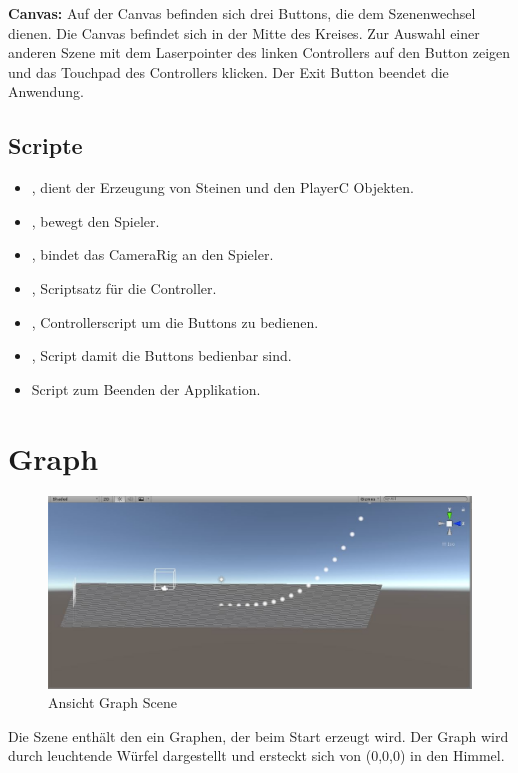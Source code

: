 \textbf{Canvas: } Auf der Canvas befinden sich drei Buttons, die dem Szenenwechsel dienen. Die Canvas befindet sich in der Mitte des Kreises. Zur Auswahl einer anderen Szene mit dem Laserpointer des linken Controllers auf den Button zeigen und das Touchpad des Controllers klicken. Der Exit Button beendet die Anwendung.

\subsection{Scripte}
\label{Spiralscripts}
\begin{itemize}
	\item {}, dient der Erzeugung von Steinen und den PlayerC Objekten.
	\item {}, bewegt den Spieler.
	\item {}, bindet das CameraRig an den Spieler.
	\item {}, Scriptsatz für die Controller.
	\item {}, Controllerscript um die Buttons zu bedienen.
	\item {}, Script damit die Buttons bedienbar sind.
	\item {} Script zum Beenden der Applikation.
\end{itemize}

\section{Graph}
\label{ graphScene }

\begin{figure}[h!]
	\includegraphics[scale=0.85]{bilder/graphScene.jpg}
	\caption{Ansicht Graph Scene}
\end{figure}

Die Szene enthält den ein Graphen, der beim Start erzeugt wird. Der Graph wird durch leuchtende Würfel dargestellt und ersteckt sich von (0,0,0) in \glqq den Himmel\grqq{}.

